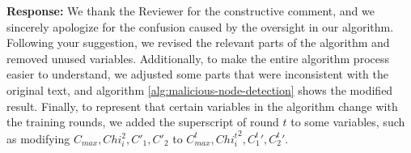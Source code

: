 \documentclass[a4paper,twoside,11pt,dvipsnames]{reviewresponse}
\begin{document}

\textbf{Response:} We thank the Reviewer for the constructive comment, and
we sincerely apologize for the confusion caused by the oversight in our algorithm.
Following your suggestion, we revised the relevant parts of the algorithm and removed unused variables.
Additionally, to make the entire algorithm process easier to understand, we adjusted some parts that were inconsistent with the original text, and algorithm \ref{alg:malicious-node-detection} shows the modified result.
Finally, to represent that certain variables in the algorithm change with the training rounds, we added the superscript of round $t$ to some variables, such as modifying $C_{max}, Chi_i^2, {C'_1}, {C'_2}$ to $C^t_{max}, {Chi^t_i}^2, {C^t_1}', {C^t_2}'$.
\end{document}
